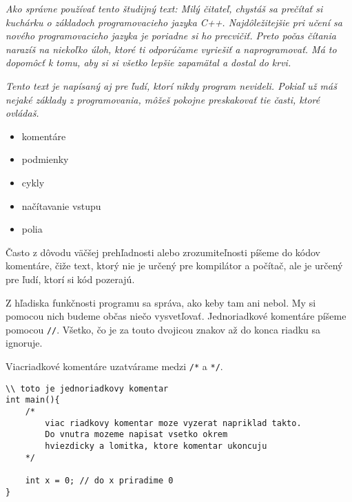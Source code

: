 




\textit{Ako správne používať tento študijný text: Milý čitateľ, chystáš sa
prečítať si kuchárku o základoch programovacieho jazyka C++. Najdôležitejšie
pri učení sa nového programovacieho jazyka je poriadne si ho precvičiť. Preto
počas čítania narazíš na niekoľko úloh, ktoré ti odporúčame vyriešiť a
naprogramovať.  Má to dopomôcť k tomu, aby si si všetko lepšie zapamätal a dostal
do krvi.}

\textit{Tento text je napísaný aj pre ľudí, ktorí nikdy program nevideli. Pokiaľ
už máš nejaké základy z programovania, môžeš pokojne preskakovať tie časti,
ktoré ovládaš.}

\begin{itemize}
    \vspace{-8pt}
    \item komentáre
    \vspace{-5pt}
    \item podmienky
    \vspace{-5pt}
    \item cykly 
    \vspace{-5pt}
    \item načítavanie vstupu
    \vspace{-5pt}
    \item polia
\end{itemize}

\medskip


Často z dôvodu väčšej prehľadnosti alebo zrozumiteľnosti píšeme do kódov komentáre,  
čiže text, ktorý nie je určený pre kompilátor a počítač, ale je určený pre ľudí,
ktorí si kód pozerajú. 

Z hľadiska funkčnosti programu sa správa, ako keby tam ani nebol.
My si pomocou nich budeme občas niečo vysvetľovať. 
Jednoriadkové komentáre píšeme pomocou \verb!//!. Všetko, čo je za touto dvojicou
znakov až do konca riadku sa ignoruje.

Viacriadkové komentáre uzatvárame medzi \verb!/*! a \verb!*/!.

\begin{lstlisting}
\\ toto je jednoriadkovy komentar
int main(){
    /*
        viac riadkovy komentar moze vyzerat napriklad takto.
        Do vnutra mozeme napisat vsetko okrem
        hviezdicky a lomitka, ktore komentar ukoncuju
    */
    
    int x = 0; // do x priradime 0
}
\end{lstlisting}

